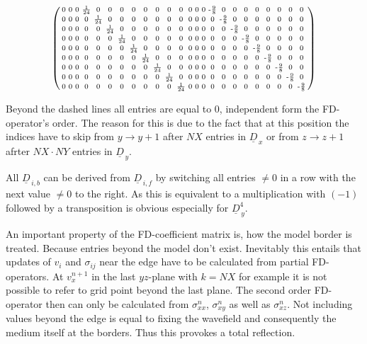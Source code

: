 \documentclass[pdftex,a4paper,parskip,listof=totoc,bibliography=totoc,onehalfspacing,12pt]{scrreprt}
\begin{document}
\begin{align*}
\begin{psmallmatrix}
0 & 0 & 0 & \frac{1}{24} & 0 & 0 & 0 & 0 & 0 & 0 & 0 & 0 & 0 & 0 & 0 & \text{-}\frac{9}{8} & 0 & 0 & 0 & 0 & 0 & 0 & 0 & 0 \\
0 & 0 & 0 & 0 & \frac{1}{24} & 0 & 0 & 0 & 0 & 0 & 0 & 0 & 0 & 0 & 0 & 0 & \text{-}\frac{9}{8} & 0 & 0 & 0 & 0 & 0 & 0 & 0 \\
0 & 0 & 0 & 0 & 0 & \frac{1}{24} & 0 & 0 & 0 & 0 & 0 & 0 & 0 & 0 & 0 & 0 & 0 & \text{-}\frac{9}{8} & 0 & 0 & 0 & 0 & 0 & 0 \\
0 & 0 & 0 & 0 & 0 & 0 & \frac{1}{24} & 0 & 0 & 0 & 0 & 0 & 0 & 0 & 0 & 0 & 0 & 0 & \text{-}\frac{9}{8} & 0 & 0 & 0 & 0 & 0 \\
0 & 0 & 0 & 0 & 0 & 0 & 0 & \frac{1}{24} & 0 & 0 & 0 & 0 & 0 & 0 & 0 & 0 & 0 & 0 & 0 & \text{-}\frac{9}{8} & 0 & 0 & 0 & 0 \\
0 & 0 & 0 & 0 & 0 & 0 & 0 & 0 & \frac{1}{24} & 0 & 0 & 0 & 0 & 0 & 0 & 0 & 0 & 0 & 0 & 0 & \text{-}\frac{9}{8} & 0 & 0 & 0 \\
0 & 0 & 0 & 0 & 0 & 0 & 0 & 0 & 0 & \frac{1}{24} & 0 & 0 & 0 & 0 & 0 & 0 & 0 & 0 & 0 & 0 & 0 & \text{-}\frac{9}{8} & 0 & 0 \\
0 & 0 & 0 & 0 & 0 & 0 & 0 & 0 & 0 & 0 & \frac{1}{24} & 0 & 0 & 0 & 0 & 0 & 0 & 0 & 0 & 0 & 0 & 0 & \text{-}\frac{9}{8} & 0 \\
0 & 0 & 0 & 0 & 0 & 0 & 0 & 0 & 0 & 0 & 0 & \frac{1}{24} & 0 & 0 & 0 & 0 & 0 & 0 & 0 & 0 & 0 & 0 & 0 & \text{-}\frac{9}{8} \\
\end{psmallmatrix}
\end{align*}

Beyond the dashed lines all entries are equal to 0, independent form the FD-operator's order. The reason for this is due to the fact that at this position the indices have to skip from $y\rightarrow y+1$ after $NX$ entries in $\underline{D}_{\,x}$ or from $z\rightarrow z+1$ afrter $NX \cdot NY$ entries in $\underline{D}_{\,y}$.

All $\underline{D}_{\,i,b}$ can be derived from $\underline{D}_{\,i,f}$ by switching all entries $\neq 0$  in a row with the next value $\neq 0$ to the right. As this is equivalent to a multiplication with $(-1)$ followed by a transposition is obvious especially for $\underline{D}_{\,y}^4$.

An important property of the FD-coefficient matrix is, how the model border is treated. Because entries beyond the model don't exist. Inevitably this entails that updates of $v_i$ and $\sigma_{ij}$ near the edge have to be calculated from partial FD-operators. At $v_x^{n+1}$ in the last $yz$-plane with $k=NX$ for example it is not possible to refer to grid point beyond the last plane. The second order FD-operator then can only be calculated from $\sigma_{xx}^n$, $\sigma_{xy}^n$ as well as $\sigma_{xz}^n$. Not including values beyond the edge is equal to fixing the wavefield and consequently the medium itself at the borders. Thus this provokes a total reflection. 
\end{document}
